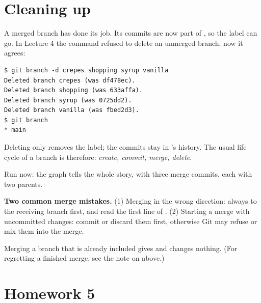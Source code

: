 \section{Cleaning up}

A merged branch has done its job. Its commits are now part of , so the label can go. In Lecture 4 the command  refused to delete an unmerged branch; now it agrees:

\begin{lstlisting}
$ git branch -d crepes shopping syrup vanilla
Deleted branch crepes (was df478ec).
Deleted branch shopping (was 633affa).
Deleted branch syrup (was 0725dd2).
Deleted branch vanilla (was fbed2d3).
$ git branch
* main
\end{lstlisting}

Deleting only removes the label; the commits stay in 's history. The usual life cycle of a branch is therefore: \emph{create, commit, merge, delete}.

Run  now: the graph tells the whole story, with three merge commits, each with two parents.

\begin{pitfall}
\textbf{Two common merge mistakes.} (1) Merging in the wrong direction: always  to the receiving branch first, and read the first line of . (2) Starting a merge with uncommitted changes: commit or discard them first, otherwise Git may refuse or mix them into the merge.
\end{pitfall}

\begin{quickfact}
Merging a branch that is already included gives  and changes nothing. (For regretting a finished merge, see the note on  above.)
\end{quickfact}

\section{Homework 5}

